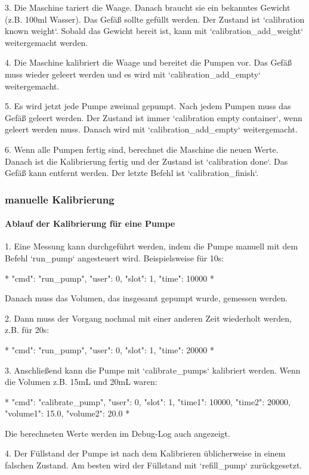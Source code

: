 3. Die Maschine tariert die Waage. Danach braucht sie ein bekanntes Gewicht (z.B. 100ml Wasser). Das Gefäß sollte gefüllt werden. Der Zustand ist `calibration known weight`. Sobald das Gewicht bereit ist, kann mit `calibration\_add\_weight` weitergemacht werden.

4. Die Maschine kalibriert die Waage und bereitet die Pumpen vor. Das Gefäß muss wieder geleert werden und es wird mit `calibration\_add\_empty` weitergemacht.

5. Es wird jetzt jede Pumpe zweimal gepumpt. Nach jedem Pumpen muss das Gefäß geleert werden. Der Zustand ist immer `calibration empty container`, wenn geleert werden muss. Danach wird mit `calibration\_add\_empty` weitergemacht.

6. Wenn alle Pumpen fertig sind, berechnet die Maschine die neuen Werte. Danach ist die Kalibrierung fertig und der Zustand ist `calibration done`. Das Gefäß kann entfernt werden. Der letzte Befehl ist `calibration\_finish`.


\subsubsection{ manuelle Kalibrierung}

\paragraph{ Ablauf der Kalibrierung für eine Pumpe}

1. Eine Messung kann durchgeführt werden, indem die Pumpe manuell mit dem Befehl `run\_pump` angesteuert wird. Beispielsweise für 10s:

*
{"cmd": "run\_pump", "user": 0, "slot": 1, "time": 10000}
*

Danach muss das Volumen, das insgesamt gepumpt wurde, gemessen werden.

2. Dann muss der Vorgang nochmal mit einer anderen Zeit wiederholt werden, z.B. für 20s:

*
{"cmd": "run\_pump", "user": 0, "slot": 1, "time": 20000}
*

3. Anschließend kann die Pumpe mit `calibrate\_pumps` kalibriert werden. Wenn die Volumen z.B. 15mL und 20mL waren:

*
{"cmd": "calibrate\_pump", "user": 0, "slot": 1, "time1": 10000, "time2": 20000, "volume1": 15.0, "volume2": 20.0}
*

Die berechneten Werte werden im Debug-Log auch angezeigt.

4. Der Füllstand der Pumpe ist nach dem Kalibrieren üblicherweise in einem falschen Zustand. Am besten wird der Füllstand mit `refill\_pump` zurückgesetzt.

